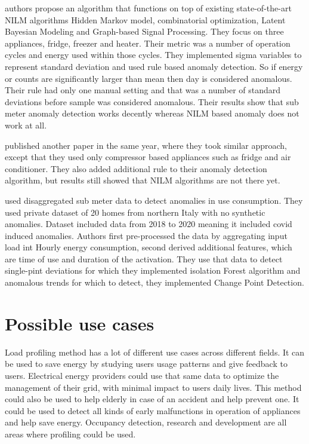 \documentclass[
11pt, %
english, %
singlespacing, %
headsepline, %
]{MastersDoctoralThesis} %
\begin{document}
\cite{NILMAD2019} authors propose an algorithm
that functions on top of existing state-of-the-art NILM algorithms Hidden Markov model,
combinatorial optimization, Latent Bayesian Modeling and Graph-based Signal Processing.
They focus on three appliances, fridge, freezer and heater. Their metric was a number of operation cycles and energy used within those cycles. 
They implemented sigma variables to represent standard deviation and used rule based anomaly detection.
So if energy or counts are significantly larger than mean then day is considered anomalous.
Their rule had only one manual setting and that was a number of standard deviations before sample was considered anomalous.
Their results show that sub meter anomaly detection works decently whereas NILM based anomaly does not work at all. 

\cite{NILMAD22019} published another paper in the same year, where they took similar approach, except that they used 
only compressor based appliances such as fridge and air conditioner. They also added additional rule to their anomaly 
detection algorithm, but results still showed that NILM algorithms are not there yet. 

\cite{Castangia2021} used disaggregated sub meter data to detect anomalies in use consumption.
They used private dataset of 20 homes from northern Italy with no synthetic anomalies. 
Dataset included data from 2018 to 2020 meaning it included covid induced anomalies. 
Authors first pre-processed the data by aggregating input load int Hourly energy consumption, 
second derived additional features, which are time of use and duration of the activation.
They use that data to detect single-pint deviations for which they implemented isolation Forest algorithm and
anomalous trends for which to detect, they implemented Change Point Detection. 

\section{Possible use cases}

Load profiling method has a lot of different use cases across different fields.
It can be used to save energy by studying users usage patterns and give feedback to users.
Electrical energy providers could use that same data to optimize the management of their grid, with minimal impact to users daily lives.
This method could also be used to help elderly in case of an accident and help prevent one. 
It could be used to detect all kinds of early malfunctions in operation of appliances and help save energy.
Occupancy detection, research and development are all areas where profiling could be used. 
\end{document}
